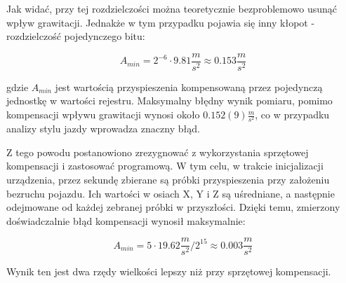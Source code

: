 Jak widać, przy tej rozdzielczości można teoretycznie bezproblemowo usunąć wpływ grawitacji. Jednakże w tym przypadku pojawia się inny kłopot - rozdzielczość pojedynczego bitu:

\begin{equation}
A_{min} = 2^{-6} \cdot 9.81\frac{m}{s^2} \approx 0.153 \frac{m}{s^2}
\end{equation}

gdzie $A_{min}$ jest wartością przyspieszenia kompensowaną przez pojedynczą jednostkę w wartości rejestru. Maksymalny błędny wynik pomiaru, pomimo kompensacji wpływu grawitacji wynosi około $0.152(9) \frac{m}{s^2}$, co w przypadku analizy stylu jazdy wprowadza znaczny błąd. 

Z tego powodu postanowiono zrezygnować z wykorzystania sprzętowej kompensacji i zastosować programową. W tym celu, w trakcie inicjalizacji urządzenia, przez sekundę zbierane są próbki przyspieszenia przy założeniu bezruchu pojazdu. Ich wartości w osiach X, Y i Z są uśredniane, a następnie odejmowane od każdej zebranej próbki w przyszłości. Dzięki temu, zmierzony doświadczalnie błąd kompensacji wynosił maksymalnie:

 \begin{equation}
A_{min} = 5 \cdot 19.62\frac{m}{s^2}/{2^{15}} \approx 0.003 \frac{m}{s^2}
\end{equation}

Wynik ten jest dwa rzędy wielkości lepszy niż przy sprzętowej kompensacji.